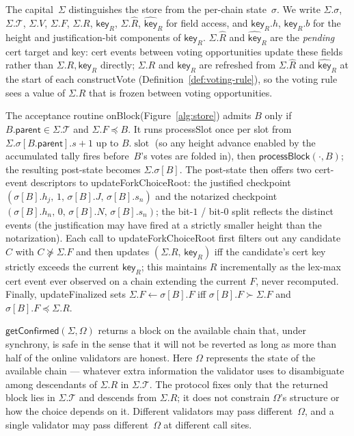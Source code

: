 \ifx\litemode\undefined\documentclass{article}\fi
\newcommand{\T}[0]{\ensuremath{\mathcal{T}}}
\newcommand{\slot}[0]{\ensuremath{\operatorname{\mathrm{slot}}}}
\newcommand{\parent}{\mathsf{parent}}
\newcommand{\key}{\mathsf{key}}
\newcommand{\processSlot}{\textsf{processSlot}\xspace}
\newcommand{\processBlock}{\textsf{processBlock}\xspace}
\newcommand{\constructVote}{\textsf{constructVote}\xspace}
\newcommand{\onBlock}{\textsf{onBlock}\xspace}
\newcommand{\updateForkChoiceRoot}{\textsf{updateForkChoiceRoot}\xspace}
\newcommand{\updateFinalized}{\textsf{updateFinalized}\xspace}
\newcommand{\getConfirmed}{\textsf{getConfirmed}\xspace}
\theoremstyle{plain}
\theoremstyle{definition}
\theoremstyle{remark}
\begin{document}
The capital~$\Sigma$ distinguishes the store from the per-chain state~$\sigma$.
We write $\Sigma.\sigma$, $\Sigma.\T$, $\Sigma.V$, $\Sigma.F$, $\Sigma.R$, $\key_R$, $\Sigma.\hat{R}$, $\hat{\key}_R$ for field access, and $\key_R.h$, $\key_R.b$ for the height and justification-bit components of $\key_R$.
$\Sigma.\hat{R}$ and $\hat{\key}_R$ are the \emph{pending} cert target and key: cert events between voting opportunities update these fields rather than $\Sigma.R, \key_R$ directly; $\Sigma.R$ and $\key_R$ are refreshed from $\Sigma.\hat{R}$ and $\hat{\key}_R$ at the start of each \constructVote{} (Definition~\ref{def:voting-rule}), so the voting rule sees a value of $\Sigma.R$ that is frozen between voting opportunities.

The acceptance routine \onBlock (Figure~\ref{alg:store}) admits $B$ only if $B.\parent \in \Sigma.\T$ and $\Sigma.F \preceq B$.
It runs \processSlot once per slot from $\Sigma.\sigma[B.\parent].s + 1$ up to $B.\slot$ (so any height advance enabled by the accumulated tally fires before~$B$'s votes are folded in), then $\processBlock(\cdot, B)$; the resulting post-state becomes $\Sigma.\sigma[B]$.
The post-state then offers two cert-event descriptors to \updateForkChoiceRoot: the justified checkpoint $(\sigma[B].h_j,\, 1,\, \sigma[B].J,\, \sigma[B].s_n)$ and the notarized checkpoint $(\sigma[B].h_n,\, 0,\, \sigma[B].N,\, \sigma[B].s_n)$; the bit-$1$ / bit-$0$ split reflects the distinct events (the justification may have fired at a strictly smaller height than the notarization).
Each call to \updateForkChoiceRoot first filters out any candidate~$C$ with $C \not\succeq \Sigma.F$ and then updates $(\Sigma.R,\, \key_R)$ iff the candidate's cert key strictly exceeds the current $\key_R$; this maintains $R$ incrementally as the lex-max cert event ever observed on a chain extending the current $F$, never recomputed.
Finally, \updateFinalized sets $\Sigma.F \gets \sigma[B].F$ iff $\sigma[B].F \succ \Sigma.F$ and $\sigma[B].F \preceq \Sigma.R$.

$\getConfirmed(\Sigma, \Omega)$ returns a block on the available chain that, under synchrony, is safe in the sense that it will not be reverted as long as more than half of the online validators are honest. Here $\Omega$ represents the state of the available chain --- whatever extra information the validator uses to disambiguate among descendants of $\Sigma.R$ in $\Sigma.\T$. The protocol fixes only that the returned block lies in $\Sigma.\T$ and descends from $\Sigma.R$; it does not constrain $\Omega$'s structure or how the choice depends on it. Different validators may pass different~$\Omega$, and a single validator may pass different~$\Omega$ at different call sites.
\end{document}
